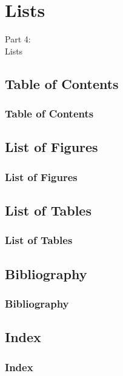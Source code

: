 
{
\renewcommand{\bgcolor}{lists}

\section{Lists}
\begin{frame}
  \vspace{25mm}
  \begin{center}
    \Huge{Part 4:\\Lists}
  \end{center}
\end{frame}

\subsection{Table of Contents}
\begin{frame}[fragile]
  \frametitle{Table of Contents}
  \vspace{3mm}
  
\end{frame}

\subsection{List of Figures}
\begin{frame}[fragile]
  \frametitle{List of Figures}
  \vspace{3mm}
  
\end{frame}

\subsection{List of Tables}
\begin{frame}[fragile]
  \frametitle{List of Tables}
  \vspace{3mm}
  
\end{frame}

\subsection{Bibliography}
\begin{frame}[fragile]
  \frametitle{Bibliography}
  \vspace{3mm}
  
\end{frame}

\subsection{Index}
\begin{frame}[fragile]
  \frametitle{Index}
  \vspace{3mm}
  
\end{frame}

}

